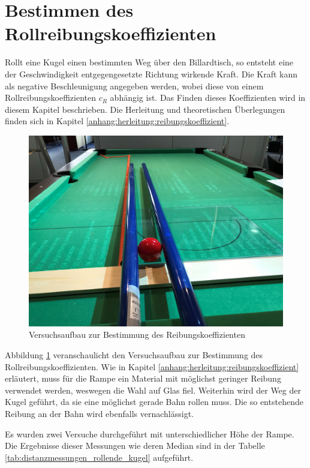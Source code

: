 \section{Bestimmen des Rollreibungskoeffizienten}
Rollt eine Kugel einen bestimmten Weg über den Billardtisch, so entsteht eine der Geschwindigkeit entgegengesetzte
Richtung wirkende Kraft. Die Kraft kann als negative Beschleunigung angegeben werden, wobei diese von einem
Rollreibungskoeffizienten $c_R$ abhängig ist. Das Finden dieses Koeffizienten wird in diesem Kapitel beschrieben.
Die Herleitung und theoretischen Überlegungen finden sich in Kapitel \ref{anhang:herleitung:reibungskoeffizient}.

\begin{figure}[h!]
    \begin{center}
        \includegraphics[width=0.5\linewidth]{../common/04_results/resources/00_versuchsaufbau_reibungskoeffizient.png}
    \end{center}
    \caption{Versuchsaufbau zur Bestimmung des Reibungskoeffizienten}
    \label{fig:versuchsaufbau_reibungskoeffizient}
\end{figure}

Abbildung \ref{fig:versuchsaufbau_reibungskoeffizient} veranschaulicht den Versuchsaufbau zur Bestimmung des
Rollreibungskoeffizienten. Wie in Kapitel \ref{anhang:herleitung:reibungskoeffizient} erläutert, muss für die
Rampe ein Material mit möglichst geringer Reibung verwendet werden, weswegen die Wahl auf Glas fiel.
Weiterhin wird der Weg der Kugel geführt, da sie eine möglichst gerade Bahn rollen muss. Die so entstehende Reibung
an der Bahn wird ebenfalls vernachlässigt.

Es wurden zwei Versuche durchgeführt mit unterschiedlicher Höhe der Rampe. Die Ergebnisse dieser Messungen wie
deren Median sind in der Tabelle \ref{tab:distanzmessungen_rollende_kugel} aufgeführt.

